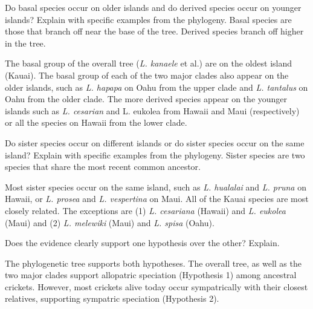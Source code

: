 \documentclass[11pt, addpoints]{exam}
\begin{document}
\begin{questions}

\question[4]
Do basal species occur on older islands and do derived species occur
on younger islands? Explain with specific examples from the phylogeny. Basal species are those that branch off near the base of the tree. Derived species branch off higher in the tree.

\begin{minipage}[t][1.35in]{\textwidth}%
\begin{solution}
The basal group of the overall tree (\textit{L. kanaele} et al.) are on the oldest island (Kauai). The basal group of each of the two major clades also appear on the older islands, such as \textit{L. hapapa} on Oahu from the upper clade and \textit{L. tantalus} on Oahu from the older clade. The more derived species appear on the younger islands such as \textit{L. cesarian} and {L. eukolea} from Hawaii and Maui (respectively) or all the species on Hawaii from the lower clade.
\end{solution} 
\end{minipage}

\question[4]
Do sister species occur on different islands or do sister species
occur on the same island? Explain with specific examples from the
phylogeny. Sister species are two species that share the most recent common ancestor.

\begin{minipage}[t][1.35in]{\textwidth}%
\begin{solution}
Most sister species occur on the same island, such as \textit{L. hualalai} and \textit{L. pruna} on Hawaii, or \textit{L. prosea} and \textit{L. vespertina} on Maui. All of the Kauai species are most closely related. The exceptions are (1) \textit{L. cesariana} (Hawaii) and \textit{L. eukolea} (Maui) and (2) \textit{L. melewiki} (Maui) and \textit{L. spisa} (Oahu).
\end{solution}
\end{minipage}

\question[4]
Does the evidence clearly support one hypothesis over the other?
Explain.

\begin{minipage}[t][1.35in]{\textwidth}%
\begin{solution}
The phylogenetic tree supports both hypotheses. The overall tree, as well as the two major clades support allopatric speciation (Hypothesis 1) among ancestral crickets. However, most crickets alive today occur sympatrically with their closest relatives, supporting sympatric speciation (Hypothesis 2).
\end{solution}
\end{minipage}


\end{questions}
\end{document}
